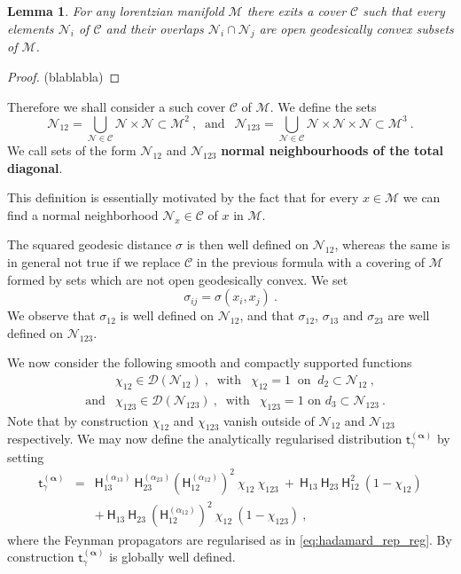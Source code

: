 \documentclass[12pt]{book}
\newcommand{\Ccal}{\mathcal{C}}
\newcommand{\Dcal}{\mathcal{D}}
\newcommand{\Mcal}{\mathcal{M}}
\newcommand{\Ncal}{\mathcal{N}}
\newcommand{\Hsf}{\mathsf{H}}
\newcommand{\tsf}{\mathsf{t}}
\theoremstyle{break}
\newtheorem{lemma}{Lemma}
\begin{document}
\begin{lemma}
For any lorentzian manifold $\Mcal$ there exits a cover $\Ccal$ such that every elements $\Ncal_i$ of $\Ccal$ and their overlaps $\Ncal_i \cap \Ncal_j$ are open geodesically convex subsets of $\Mcal$.
\end{lemma}


\begin{proof}
(blablabla)
\end{proof}


Therefore we shall consider a such cover $\Ccal$ of $\Mcal$. We define the sets
%
\begin{equation*}
\Ncal_{12} = \bigcup_{\Ncal\in\Ccal} \Ncal \times \Ncal \subset \Mcal^2 \ , \ \mbox{ and } \ \  \Ncal_{123} = \bigcup_{\Ncal\in\Ccal} \Ncal \times \Ncal\times \Ncal \subset \Mcal^3 \ . 
\end{equation*}
%
We call sets of the form $\Ncal_{12}$ and $\Ncal_{123}$ \textbf{normal neighbourhoods of the total diagonal}. 


This definition is essentially motivated by the fact that for every $x \in \Mcal$ we can find a normal neighborhood $\Ncal_x \in \Ccal$ of $x$ in $\Mcal$. 



The squared geodesic distance $\sigma$ is then well defined on $\mathcal{N}_{12}$, whereas the same is in general not true if we replace $\mathcal{C}$ in the previous formula with a covering of $\mathcal{M}$ formed by sets which are not open geodesically convex. We set 
%
\begin{equation*}
\sigma_{ij} = \sigma(x_i,x_j) \ .
\end{equation*}
%
We observe that $\sigma_{12}$ is well defined on $\Ncal_{12}$, and that $\sigma_{12}$, $\sigma_{13}$ and $\sigma_{23}$ are well defined on $\Ncal_{123}$. 


We now consider the following smooth and compactly supported functions
%
\begin{eqnarray*}
&& \chi_{12} \in \Dcal(\Ncal_{12}) \ , \ \mbox{ with } \ \ \chi_{12} = 1 \ \mbox{ on } \ d_2 \subset \Ncal_{12} \ , \\[6pt]
&\mbox{and}& \chi_{123} \in \Dcal(\Ncal_{123}) \ , \ \mbox{ with } \ \ \chi_{123} = 1 \mbox{ on } d_3 \subset \Ncal_{123} \ . 
\end{eqnarray*}
%
Note that by construction $\chi_{12}$ and $\chi_{123}$ vanish outside of $\Ncal_{12}$ and $\Ncal_{123}$ respectively. We may now define the analytically regularised distribution $\tsf^{(\boldsymbol{\alpha})}_\gamma$ by setting
%
\begin{eqnarray}
\tsf^{(\boldsymbol{\alpha})}_\gamma &=& \Hsf^{(\alpha_{13})}_{13} \ \Hsf^{(\alpha_{23})}_{23} \left(\Hsf^{(\alpha_{12})}_{12}\right)^2 \ \chi_{12} \ \chi_{123} \ + \ \Hsf_{13} \ \Hsf_{23} \ \Hsf_{12}^2 \ (1-\chi_{12}) \nonumber \\[3pt]
&& + \ \Hsf_{13} \ \Hsf_{23} \ \left(\Hsf^{(\alpha_{12})}_{12}\right)^2 \ \chi_{12} \ (1-\chi_{123}) \ , 
\label{eq:kernel_reg_glob}
\end{eqnarray}
%
where the Feynman propagators are regularised as in \ref{eq:hadamard_rep_reg}. By construction $\tsf^{(\boldsymbol{\alpha})}_\gamma$ is globally well defined.
\end{document}

